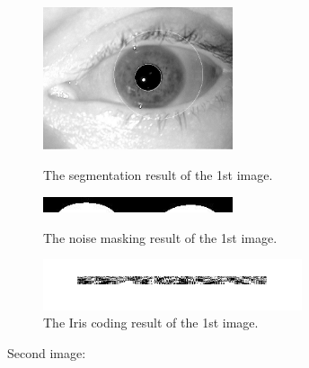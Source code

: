 \documentclass[a4paper]{article}
\begin{document}
\begin{spacing}{2.0}
\begin{enumerate}
	\begin{figure}[H]
	\begin{minipage}[t]{0.3\linewidth}
	\centering
	\includegraphics[width = 2.2in]{probe1segmented.jpg}
	\caption{The segmentation result of the 1st image.}
	\label{seg}
	\end{minipage}
	\begin{minipage}[t]{0.3\linewidth}
	\centering
	\includegraphics[width = 2.2in]{probe1polarnoise.jpg}
	\caption{The noise masking result of the 1st image.}
	\label{noiseM}
	\end{minipage}
	\begin{minipage}[t]{0.3\linewidth}
	\centering
	\includegraphics[width = 3in]{iriscoding1.jpg}
	\caption{The Iris coding result of the 1st image.}
	\label{IC}
	\end{minipage}
	\end{figure}
	
	Second image:\\
	

\end{enumerate}
\end{spacing}
\end{document}
